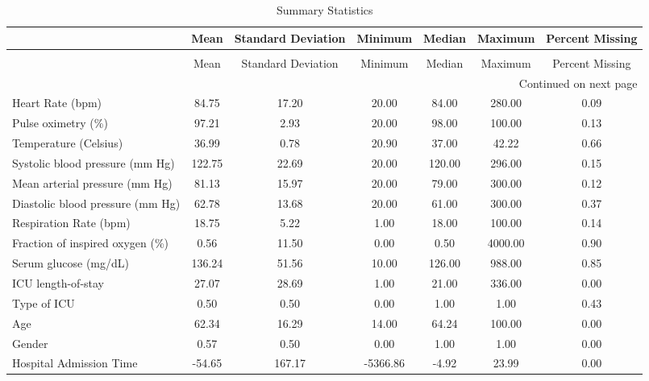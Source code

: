 \begin{longtable}{lcccccc}
\caption{Summary Statistics}
\label{tab_describe}\\
\toprule
\hline
{} &   Mean & Standard Deviation &  Minimum & Median & Maximum & Percent Missing \\
\hline
\midrule
\hline
\endfirsthead
\caption[]{Summary Statistics} \\
\toprule
{} &   Mean & Standard Deviation &  Minimum & Median & Maximum & Percent Missing \\
\midrule
\endhead
\midrule
\multicolumn{7}{r}{{Continued on next page}} \\
\midrule
\hline
\endfoot

\bottomrule
\hline
\endlastfoot
Heart Rate (bpm)                 &  84.75 &              17.20 &    20.00 &  84.00 &  280.00 &            0.09 \\
Pulse oximetry (\%)               &  97.21 &               2.93 &    20.00 &  98.00 &  100.00 &            0.13 \\
Temperature (Celsius)            &  36.99 &               0.78 &    20.90 &  37.00 &   42.22 &            0.66 \\
Systolic blood pressure (mm Hg)  & 122.75 &              22.69 &    20.00 & 120.00 &  296.00 &            0.15 \\
Mean arterial pressure (mm Hg)   &  81.13 &              15.97 &    20.00 &  79.00 &  300.00 &            0.12 \\
Diastolic blood pressure (mm Hg) &  62.78 &              13.68 &    20.00 &  61.00 &  300.00 &            0.37 \\
Respiration Rate (bpm)           &  18.75 &               5.22 &     1.00 &  18.00 &  100.00 &            0.14 \\
Fraction of inspired oxygen (\%)  &   0.56 &              11.50 &     0.00 &   0.50 & 4000.00 &            0.90 \\
Serum glucose (mg/dL)            & 136.24 &              51.56 &    10.00 & 126.00 &  988.00 &            0.85 \\
ICU length-of-stay               &  27.07 &              28.69 &     1.00 &  21.00 &  336.00 &            0.00 \\
Type of ICU                      &   0.50 &               0.50 &     0.00 &   1.00 &    1.00 &            0.43 \\
Age                              &  62.34 &              16.29 &    14.00 &  64.24 &  100.00 &            0.00 \\
Gender                           &   0.57 &               0.50 &     0.00 &   1.00 &    1.00 &            0.00 \\
Hospital Admission Time          & -54.65 &             167.17 & -5366.86 &  -4.92 &   23.99 &            0.00 \\
\end{longtable}
